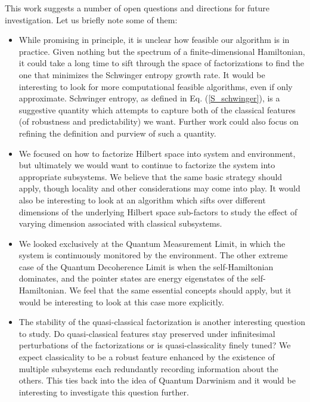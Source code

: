 \documentclass[aps,pra,onecolumn,nofootinbib,12pt,tightenlines]{revtex4-1}
\begin{document}
This work suggests a number of open questions and directions for future investigation.
Let us briefly note some of them:
\begin{itemize}
\item{While promising in principle, it is unclear how feasible our algorithm is in practice. Given nothing but the spectrum of a finite-dimensional Hamiltonian, it could take a long time to sift through the space of factorizations to find the one that minimizes the Schwinger entropy growth rate. It would be interesting to look for more computational feasible algorithms, even if only approximate. Schwinger entropy, as defined in Eq. (\ref{S_schwinger}), is a suggestive quantity which attempts to capture both of the classical features (of robustness and predictability) we want. Further work could also focus on refining the definition and purview of such a quantity.}
\item{We focused on how to factorize Hilbert space into system and environment, but ultimately we would want to continue to factorize the system into appropriate subsystems. We believe that the same basic strategy should apply, though locality and other considerations may come into play. It would also be interesting to look at an algorithm which sifts over different dimensions of the underlying Hilbert space sub-factors to study the effect of varying dimension associated with classical subsystems.}
\item{We looked exclusively at the Quantum Measurement Limit, in which the system is continuously monitored by the environment. The other extreme case of the Quantum Decoherence Limit is when the self-Hamiltonian dominates, and the pointer states are energy eigenstates of the self-Hamiltonian. We feel that the same essential concepts should apply, but it would be interesting to look at this case more explicitly.}
\item{The stability of the quasi-classical factorization is another interesting question to study. Do quasi-classical features stay preserved under infinitesimal perturbations of the factorizations or is quasi-classicality finely tuned? We expect classicality to be a robust feature enhanced by the existence of multiple subsystems each redundantly recording information about the others. This ties back into the idea of Quantum Darwinism \cite{riedel2012} and it would be interesting to investigate this question further. }
\end{itemize}
\end{document}
